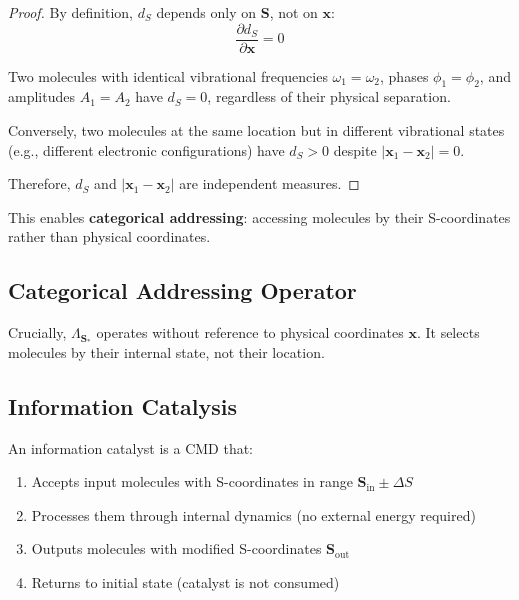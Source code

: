 \begin{proof}
By definition, $d_S$ depends only on $\mathbf{S}$, not on $\mathbf{x}$:
\begin{equation}
\frac{\partial d_S}{\partial \mathbf{x}} = 0
\end{equation}

Two molecules with identical vibrational frequencies $\omega_1 = \omega_2$, phases $\phi_1 = \phi_2$, and amplitudes $A_1 = A_2$ have $d_S = 0$, regardless of their physical separation.

Conversely, two molecules at the same location but in different vibrational states (e.g., different electronic configurations) have $d_S > 0$ despite $|\mathbf{x}_1 - \mathbf{x}_2| = 0$.

Therefore, $d_S$ and $|\mathbf{x}_1 - \mathbf{x}_2|$ are independent measures.
\end{proof}

This enables \textbf{categorical addressing}: accessing molecules by their S-coordinates rather than physical coordinates.

\subsection{Categorical Addressing Operator}


Crucially, $\Lambda_{\mathbf{S}_*}$ operates without reference to physical coordinates $\mathbf{x}$. It selects molecules by their internal state, not their location.

\subsection{Information Catalysis}

\begin{definition}
An information catalyst is a CMD that:
\begin{enumerate}
\item Accepts input molecules with S-coordinates in range $\mathbf{S}_{\text{in}} \pm \Delta S$
\item Processes them through internal dynamics (no external energy required)
\item Outputs molecules with modified S-coordinates $\mathbf{S}_{\text{out}}$
\item Returns to initial state (catalyst is not consumed)
\end{enumerate}
\end{definition}


